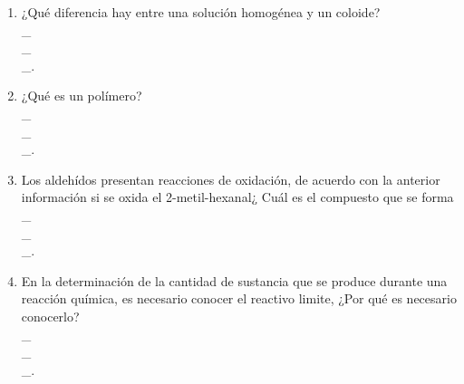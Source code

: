 \begin{enumerate}


\item   ¿Qué diferencia hay entre una solución homogénea y un coloide?\label{jenn-22}\hrulefill\\
\_\hrulefill\\
\_\hrulefill\\
\_\hrulefill.




\item ¿Qué es un polímero? \label{jenn-23}\hrulefill\\
\_\hrulefill\\
\_\hrulefill\\
\_\hrulefill.





\item  Los aldehídos presentan reacciones de oxidación, de acuerdo con la anterior información si se oxida el 2-metil-hexanal¿ Cuál es el compuesto que se forma \label{jenn-24}\hrulefill\\
\_\hrulefill\\
\_\hrulefill\\
\_\hrulefill.







\item  En la determinación de la cantidad de sustancia que se produce durante una reacción química, es necesario conocer el reactivo limite, ¿Por qué es necesario conocerlo?
\label{jenn-25}\hrulefill\\
\_\hrulefill\\
\_\hrulefill\\
\_\hrulefill.








\end{enumerate}
